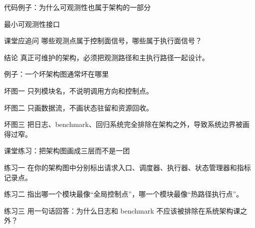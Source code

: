 \begin{frame}{代码例子：为什么可观测性也属于架构的一部分}
  \begin{block}{最小可观测性接口}
    {\ttfamily\small
    \par
    \par
    \par
    }
  \end{block}
  \pause
  \begin{block}{课堂应追问}
    哪些观测点属于控制面信号，哪些属于执行面信号？
  \end{block}
  \pause
  \begin{block}{结论}
    真正可维护的架构，必须把观测路径和主执行路径一起设计。
  \end{block}
\end{frame}

\begin{frame}{例子：一个坏架构图通常坏在哪里}
  \begin{block}{坏图一}
    只列模块名，不说明调用方向和控制点。
  \end{block}
  \pause
  \begin{block}{坏图二}
    只画数据流，不画状态驻留和资源回收。
  \end{block}
  \pause
  \begin{block}{坏图三}
    把日志、benchmark、回归系统完全排除在架构之外，导致系统边界被画得过窄。
  \end{block}
\end{frame}

\begin{frame}{课堂练习：把架构图画成三层而不是一团}
  \begin{block}{练习一}
    在你的架构图中分别标出请求入口、调度器、执行器、状态管理器和指标记录点。
  \end{block}
  \pause
  \begin{block}{练习二}
    指出哪一个模块最像“全局控制点”，哪一个模块最像“热路径执行点”。
  \end{block}
  \pause
  \begin{block}{练习三}
    用一句话回答：为什么日志和 benchmark 不应该被排除在系统架构课之外？
  \end{block}
\end{frame}

